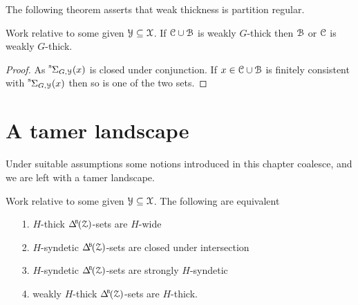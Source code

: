 The following theorem asserts that weak thickness is partition regular.

\begin{theorem}\label{thm_wt_partreg}
  Work relative to some given $\EuScript Y\subseteq\EuScript X$.
  If $\EuScript C\cup\EuScript B$ is weakly $G$-thick then $\EuScript B$ or $\EuScript C$ is weakly $G$-thick.
\end{theorem}

\begin{proof}
  As ${\mathstrut}^{\rm s}\kern-.1ex\Sigma_{G,\EuScript Y}(x)$ is closed under conjunction.
  If $x\in \EuScript C\cup\EuScript B$ is finitely consistent with ${\mathstrut}^{\rm s}\kern-.1ex\Sigma_{G,\EuScript Y}(x)$ then so is one of the two sets.
\end{proof}

\section{A tamer landscape}\label{tame_landscape}

Under suitable assumptions some notions introduced in this chapter coalesce, and we are left with a tamer landscape.

\begin{theorem}\label{thm_coalesce}
  Work relative to some given $\EuScript Y\subseteq\EuScript X$.
  The following are equivalent
  \begin{itemize}
    \item[1.] $H$-thick $\BDelta({\Z})$-sets are $H$-wide
    \item[2.] $H$-syndetic $\BDelta({\Z})$-sets are closed under intersection 
    \item[3.] $H$-syndetic $\BDelta({\Z})$-sets are strongly $H$-syndetic
    \item[4.] weakly $H$-thick $\BDelta({\Z})$-sets are $H$-thick.
  \end{itemize}
\end{theorem}

